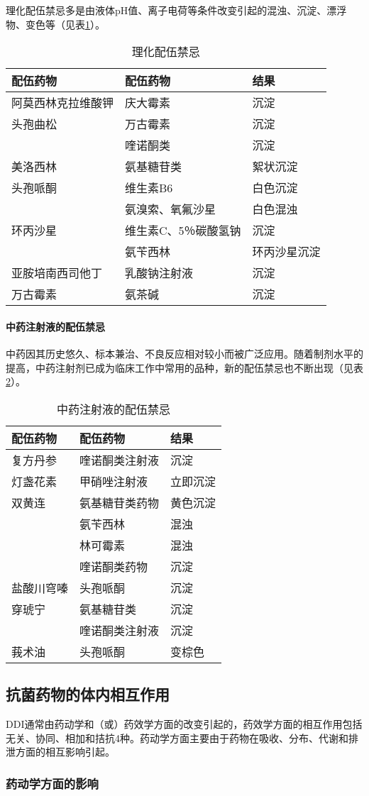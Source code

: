 理化配伍禁忌多是由液体pH值、离子电荷等条件改变引起的混浊、沉淀、漂浮物、变色等（见表\ref{tab8-1}）。

\begin{longtable}[]{@{}lll@{}}
\caption{理化配伍禁忌}
\label{tab8-1}\\
\toprule
\endhead
配伍药物 & 配伍药物 & 结果\tabularnewline
\midrule
阿莫西林克拉维酸钾 & 庆大霉素 & 沉淀\tabularnewline
头孢曲松 & 万古霉素 & 沉淀\tabularnewline
& 喹诺酮类 & 沉淀\tabularnewline
美洛西林 & 氨基糖苷类 & 絮状沉淀\tabularnewline
头孢哌酮 & 维生素B{6} & 白色沉淀\tabularnewline
& 氨溴索、氧氟沙星 & 白色混浊\tabularnewline
环丙沙星 & 维生素C、5％碳酸氢钠 & 沉淀\tabularnewline
& 氨苄西林 & 环丙沙星沉淀\tabularnewline
亚胺培南西司他丁 & 乳酸钠注射液 & 沉淀\tabularnewline
万古霉素 & 氨茶碱 & 沉淀\tabularnewline
\bottomrule
\end{longtable}
\paragraph{中药注射液的配伍禁忌}

中药因其历史悠久、标本兼治、不良反应相对较小而被广泛应用。随着制剂水平的提高，中药注射剂已成为临床工作中常用的品种，新的配伍禁忌也不断出现（见表\ref{tab8-2}）。

\begin{longtable}[]{@{}lll@{}}
    \caption{中药注射液的配伍禁忌}
\label{tab8-2}\\
\toprule
\endhead
配伍药物 & 配伍药物 & 结果\tabularnewline
\midrule
复方丹参 & 喹诺酮类注射液 & 沉淀\tabularnewline
灯盏花素 & 甲硝唑注射液 & 立即沉淀\tabularnewline
双黄连 & 氨基糖苷类药物 & 黄色沉淀\tabularnewline
& 氨苄西林 & 混浊\tabularnewline
& 林可霉素 & 混浊\tabularnewline
& 喹诺酮类药物 & 沉淀\tabularnewline
盐酸川穹嗪 & 头孢哌酮 & 沉淀\tabularnewline
穿琥宁 & 氨基糖苷类 & 沉淀\tabularnewline
& 喹诺酮类注射液 & 沉淀\tabularnewline
莪术油 & 头孢哌酮 & 变棕色\tabularnewline
\bottomrule
\end{longtable}

\subsection{抗菌药物的体内相互作用}

DDI通常由药动学和（或）药效学方面的改变引起的，药效学方面的相互作用包括无关、协同、相加和拮抗4种。药动学方面主要由于药物在吸收、分布、代谢和排泄方面的相互影响引起。

\subsubsection{药动学方面的影响}
